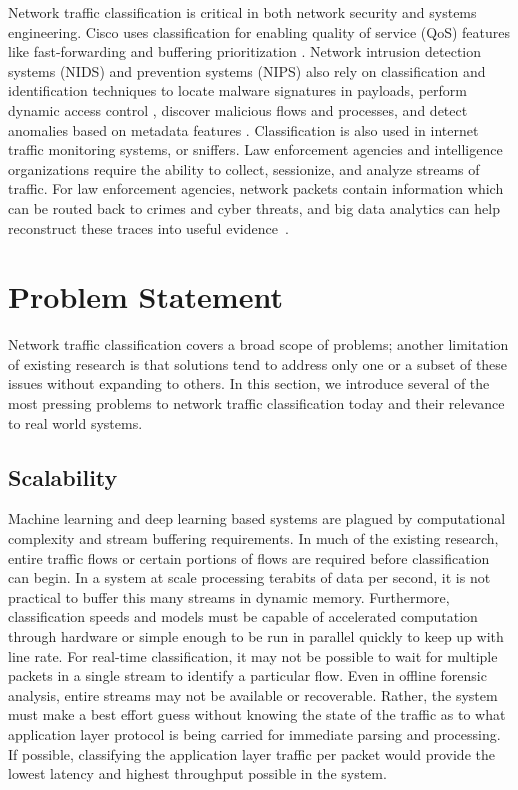 Network traffic classification is critical in both network security and systems engineering. Cisco uses classification for enabling quality of service (QoS) features like fast-forwarding and buffering prioritization \cite{Cisco}. Network intrusion detection systems (NIDS) and prevention systems (NIPS) also rely on classification and identification techniques to locate malware signatures in payloads, perform dynamic access control \cite{DIAS2019143}, discover malicious flows and processes, and detect anomalies based on metadata features \cite{Boger}. Classification is also used in internet traffic monitoring systems, or sniffers. Law enforcement agencies and intelligence organizations require the ability to collect, sessionize, and analyze streams of traffic. For law enforcement agencies, network packets contain information which can be routed back to crimes and cyber threats, and big data analytics can help reconstruct these traces into useful evidence~\cite{actionable-intelligence}.

\section{Problem Statement}
Network traffic classification covers a broad scope of problems; another limitation of existing research is that solutions tend to address only one or a subset of these issues without expanding to others. In this section, we introduce several of the most pressing problems to network traffic classification today and their relevance to real world systems.

\subsection{Scalability}

Machine learning and deep learning based systems are plagued by computational complexity and stream buffering requirements. In much of the existing research, entire traffic flows or certain portions of flows are required before classification can begin. In a system at scale processing terabits of data per second, it is not practical to buffer this many streams in dynamic memory. Furthermore, classification speeds and models must be capable of accelerated computation through hardware or simple enough to be run in parallel quickly to keep up with line rate. For real-time classification, it may not be possible to wait for multiple packets in a single stream to identify a particular flow. Even in offline forensic analysis, entire streams may not be available or recoverable. Rather, the system must make a best effort guess without knowing the state of the traffic as to what application layer protocol is being carried for immediate parsing and processing. If possible, classifying the application layer traffic per packet would provide the lowest latency and highest throughput possible in the system.

